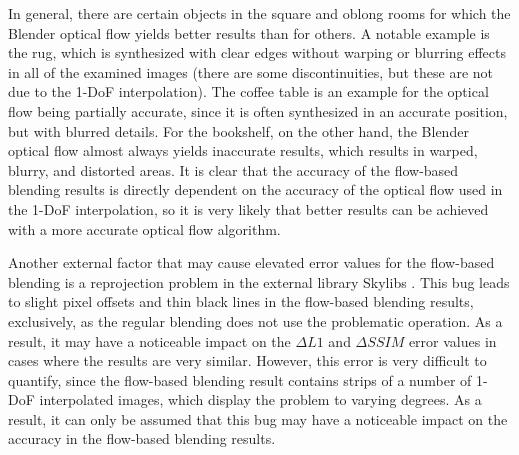 In general, there are certain objects in the square and oblong rooms for which the Blender optical flow yields better results than for others. A notable example is the rug, which is synthesized with clear edges without warping or blurring effects in all of the examined images (there are some discontinuities, but these are not due to the 1-DoF interpolation). The coffee table is an example for the optical flow being partially accurate, since it is often synthesized in an accurate position, but with blurred details. For the bookshelf, on the other hand, the Blender optical flow almost always yields inaccurate results, which results in warped, blurry, and distorted areas. It is clear that the accuracy of the flow-based blending results is directly dependent on the accuracy of the optical flow used in the 1-DoF interpolation, so it is very likely that better results can be achieved with a more accurate optical flow algorithm.


Another external factor that may cause elevated error values for the flow-based blending is a reprojection problem in the external library Skylibs \cite{skylibs}. This bug leads to slight pixel offsets and thin black lines in the flow-based blending results, exclusively, as the regular blending does not use the problematic operation. As a result, it may have a noticeable impact on the $\Delta L1$ and $\Delta SSIM$ error values in cases where the results are very similar. However, this error is very difficult to quantify, since the flow-based blending result contains strips of a number of 1-DoF interpolated images, which display the problem to varying degrees. As a result, it can only be assumed that this bug may have a noticeable impact on the accuracy in the flow-based blending results.


